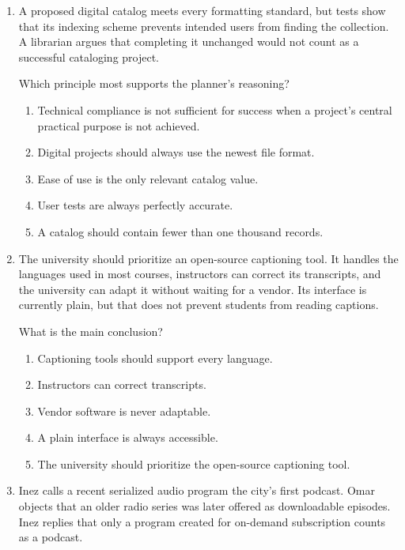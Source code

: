 \begin{enumerate}
\item A proposed digital catalog meets every formatting standard, but tests show that its indexing scheme prevents intended users from finding the collection. A librarian argues that completing it unchanged would not count as a successful cataloging project.

Which principle most supports the planner's reasoning?
\begin{enumerate}
\item[(A)] Technical compliance is not sufficient for success when a project's central practical purpose is not achieved.
\item[(B)] Digital projects should always use the newest file format.
\item[(C)] Ease of use is the only relevant catalog value.
\item[(D)] User tests are always perfectly accurate.
\item[(E)] A catalog should contain fewer than one thousand records.
\end{enumerate}

\item The university should prioritize an open-source captioning tool. It handles the languages used in most courses, instructors can correct its transcripts, and the university can adapt it without waiting for a vendor. Its interface is currently plain, but that does not prevent students from reading captions.

What is the main conclusion?
\begin{enumerate}
\item[(A)] Captioning tools should support every language.
\item[(B)] Instructors can correct transcripts.
\item[(C)] Vendor software is never adaptable.
\item[(D)] A plain interface is always accessible.
\item[(E)] The university should prioritize the open-source captioning tool.
\end{enumerate}

\item Inez calls a recent serialized audio program the city's first podcast. Omar objects that an older radio series was later offered as downloadable episodes. Inez replies that only a program created for on-demand subscription counts as a podcast.


\end{enumerate}
